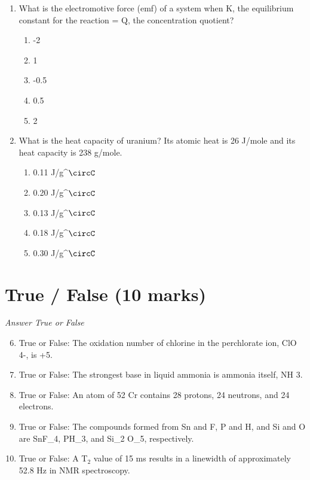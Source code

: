 \documentclass[12pt]{article}
\begin{document}
\begin{enumerate}[label=\arabic*.]
\begin{enumerate}[label=(\alph*)]
\end{enumerate}
\item What is the electromotive force (emf) of a system when K, the equilibrium constant for the reaction = Q, the concentration quotient?
\begin{enumerate}[label=(\alph*)]
    \item -2
    \item 1
    \item -0.5
    \item 0.5
    \item 2
\end{enumerate}
\item What is the heat capacity of uranium? Its atomic heat is 26 J/mole and its heat capacity is 238 g/mole.
\begin{enumerate}[label=(\alph*)]
    \item 0.11 J/g^\ensuremath{\circC}
    \item 0.20 J/g^\ensuremath{\circC}
    \item 0.13 J/g^\ensuremath{\circC}
    \item 0.18 J/g^\ensuremath{\circC}
    \item 0.30 J/g^\ensuremath{\circC}
\end{enumerate}
\end{enumerate}

\section*{True / False (10 marks)}
\textit{Answer True or False}
\begin{enumerate}[label=\arabic*.]
\setcounter{enumi}{5}
\item True or False: The oxidation number of chlorine in the perchlorate ion, ClO 4-, is +5.
\item True or False: The strongest base in liquid ammonia is ammonia itself, NH 3.
\item True or False: An atom of 52 Cr contains 28 protons, 24 neutrons, and 24 electrons.
\item True or False: The compounds formed from Sn and F, P and H, and Si and O are SnF\_4, PH\_3, and Si\_2 O\_5, respectively.
\item True or False: A T$_{2}$ value of 15 ms results in a linewidth of approximately 52.8 Hz in NMR spectroscopy.
\end{enumerate}
\end{document}
